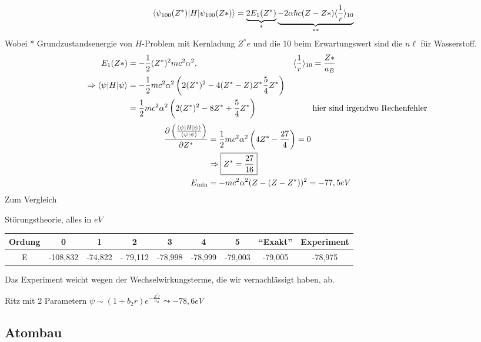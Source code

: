 	\begin{align*}
		\braket{\psi_{100}(Z^*) | H | \psi_{100}(Z*)} 
		&= \underbrace{2E_1(Z^*)}_{\mathclap{*}} 
		\underbrace{- 2 \alpha \hbar c (Z - Z*) \erw{\frac{1}{r}}_{10}}_{\mathclap{**}}
	\end{align*}
Wobei * Grundzustandsenergie von $H$-Problem mit Kernladung $Z^* e$ und die $10$ beim Erwartungswert sind die $n \ell$ für Wasserstoff.
	\begin{align*}
		E_1(Z*) &= - \frac{1}{2} (Z^*)^2 m c^2 \alpha^2 ,&
		\langle {\frac{1}{r}} \rangle_{10} &= \frac{Z*}{a_B} \\
		\Rightarrow \braket{\psi | H | \psi} &= 
		-\frac{1}{2} m c^2 \alpha^2 
		\left( 2 (Z^*)^2 - 4 (Z^* - Z)Z^* \frac{5}{4} Z^* \right)\\
		&= \frac{1}{2} m c^2 \alpha^2 
		\left( 2 (Z^*)^2 - 8Z^* + \frac{5}{4} Z^* \right) & &\text{hier sind irgendwo Rechenfehler}
	\end{align*}
	\begin{align*}
		\frac{\partial \left(
			\frac{\braket{\psi | H | \psi}}{\braket{\psi | \psi}}
			\right)}{\partial Z^*}
		&= \frac{1}{2} m c^2 \alpha^2 \left( 4 Z^* - \frac{27}{4} \right) = 0 \\
		& \Rightarrow \boxed{Z^* = \frac{27}{16}} \\
		E_{\text{min}} &= - m c^2 \alpha^2 (Z- (Z - Z^*))^2 = -77,5eV
	\end{align*}
Zum Vergleich 

Störungstheorie, alles in $eV$ \\
	\begin{tabular}{c | c | c | c | c | c | c | c | c}
		Ordung & 0 & 1 & 2 & 3 & 4 & 5 & ``Exakt'' & Experiment \\
		\hline
		E & -108,832 & -74,822 & - 79,112 & -78,998 & -78,999 & -79,003 & -79,005 & -78,975
	\end{tabular}
Das Experiment weicht wegen der Wechselwirkungsterme, die wir vernachlässigt haben, ab.
	
	Ritz mit 2 Parametern $\psi \sim (1 + b_2 r) e^{-\frac{Z^* r}{a_B}} \leadsto -78,6eV$

\subsection{Atombau}


